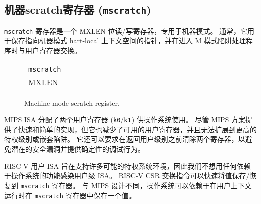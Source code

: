 \subsection{机器scratch寄存器 ({\tt mscratch})}

\iffalse
The {\tt mscratch} register is an MXLEN-bit read/write register
dedicated for use by machine mode.  Typically, it is used to hold a
pointer to a machine-mode hart-local context space and swapped with a
user register upon entry to an M-mode trap handler.
\fi
{\tt mscratch} 寄存器是一个 MXLEN 位读/写寄存器，专用于机器模式。 通常，它用于保存指向机器模式 hart-local 上下文空间的指针，并在进入 M 模式陷阱处理程序时与用户寄存器交换。

\begin{figure}[h!]
{\footnotesize
\begin{center}
\begin{tabular}{@{}J}
 \\
\hline
{} \\
\hline
MXLEN \\
\end{tabular}
\end{center}
}
\vspace{-0.1in}
\caption{Machine-mode scratch register.}
\label{mscratchreg}
\end{figure}

\iffalse
\begin{commentary}
The MIPS ISA allocated two user registers ({\tt k0}/{\tt k1}) for use
by the operating system.  Although the MIPS scheme provides a fast and
simple implementation, it also reduces available user registers,  and
does not scale to further privilege levels, or nested traps.  It can
also require both registers are cleared before returning to user level
to avoid a potential security hole and to provide deterministic
debugging behavior.

The RISC-V user ISA was designed to support many possible privileged
system environments and so we did not want to infect the user-level
ISA with any OS-dependent features.  The RISC-V CSR swap instructions
can quickly save/restore values to the {\tt mscratch} register.
Unlike the MIPS design, the OS can rely on holding a value in the {\tt
  mscratch} register while the user context is running.
\end{commentary}
\fi

\begin{commentary}
MIPS ISA 分配了两个用户寄存器 ({\tt k0}/{\tt k1}) 供操作系统使用。 尽管 MIPS 方案提供了快速和简单的实现，但它也减少了可用的用户寄存器，并且无法扩展到更高的特权级别或嵌套陷阱。 它还可以要求在返回用户级别之前清除两个寄存器，以避免潜在的安全漏洞并提供确定性的调试行为。

RISC-V 用户 ISA 旨在支持许多可能的特权系统环境，因此我们不想用任何依赖于操作系统的功能感染用户级 ISA。 RISC-V CSR 交换指令可以快速将值保存/恢复到 {\tt mscratch} 寄存器。 与 MIPS 设计不同，操作系统可以依赖于在用户上下文运行时在 {\tt mscratch} 寄存器中保存一个值。
\end{commentary}


